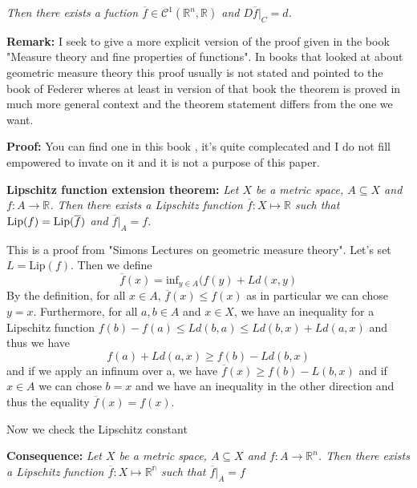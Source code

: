 \documentclass{article}
\begin{document}
\textit{Then there exists a fuction $\overline f\in\mathcal{C}^1(\mathbb{R}^n,\mathbb{R})$
and $D\overline f|_C=d$.}

\vspace{1ex}
\textbf{Remark:}
I seek to give a more explicit version of the proof given in the book "Measure
theory and fine properties of functions". In books that looked at about
geometric measure theory this proof usually is not stated and pointed to the
book of Federer wheres at least in version of that book the theorem is proved
in much more general context and the theorem statement differs from the one we
want.

\vspace{1ex}
\textbf{Proof:} You can find one in this book \cite{evans_gariepy}, it's quite
complecated and I do not fill empowered to invate on it and it is not a purpose
of this paper.


\vspace{2ex}
\textbf{Lipschitz function extension theorem:} \textit{Let $X$ be a metric space,
$A\subseteq X$ and $f:A\rightarrow\mathbb{R}$. Then there exists a Lipschitz
function $\overline f:X\mapsto\mathbb{R}$ such that $\textnormal{Lip}(f)=\textnormal{Lip}
(\overline f)$ and $\overline f|_A=f$.}

\vspace{1ex}
This is a proof from "Simons Lectures on geometric measure theory". Let's set
$L=\text{Lip}(f)$. Then we define
\[\overline f(x) = \text{inf}_{y\in A}(f(y)+Ld(x,y)\]
By the definition, for all $x\in A$, $\overline f(x)\leq f(x)$ as in particular
we can chose $y=x$.
Furthermore, for all $a,b\in A$ and $x\in X$, we have an inequality for a
Lipschitz function $f(b)-f(a)\leq Ld(b,a)\leq Ld(b,x)+Ld(a,x)$ and thus we have
\[ f(a)+Ld(a,x)\geq f(b)-Ld(b,x)\] 
and if we apply an infinum over a, we have $\overline f(x)\geq f(b)-L(b,x)$ and
if $x\in A$ we can chose $b=x$ and we have an inequality in the other direction
and thus the equality $\overline f(x)=f(x)$.

\vspace{1ex}
Now we check the Lipschitz constant
%

\vspace{1ex}
\textbf{Consequence:} \textit{Let $X$ be a metric space, $A\subseteq X$ and
$f:A\rightarrow\mathbb{R}^n$. Then there exists a Lipschitz
function $\overline f:X\mapsto\mathbb{R^n}$ such that $\overline f|_A=f$}
\end{document}
